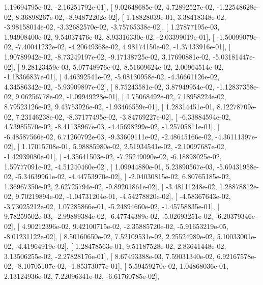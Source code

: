\documentclass{article}
\begin{document}
          1.19694795e-02,  -2.16251792e-01],
       [  9.02648685e-02,   4.72892527e-02,  -1.22548628e-02,
          8.36898267e-02,  -8.94872202e-02],
       [  1.18828039e-01,   3.38418348e-02,  -3.98158014e-02,
         -3.32682570e-02,  -3.75765338e-02],
       [  1.27877195e-03,   1.94908400e-02,   9.54037476e-02,
          8.93316330e-02,  -2.03399019e-01],
       [ -1.50099079e-02,  -7.40041232e-02,  -4.20649368e-02,
          4.98174150e-02,  -1.37133916e-01],
       [  1.90789942e-02,  -8.73249197e-02,  -9.17138725e-02,
          3.17690881e-02,  -5.03181447e-02],
       [  9.28123459e-03,   5.07748976e-02,   8.51609624e-02,
          2.00964514e-02,  -1.18366837e-01],
       [  4.46392541e-02,  -5.08130958e-02,  -4.36661126e-02,
          4.34586342e-02,  -5.93909897e-02],
       [  8.75243581e-02,   3.87949954e-02,  -1.12837358e-02,
          9.06256778e-02,  -1.09949228e-01],
       [  1.75068492e-02,   7.18958224e-02,   8.79523126e-02,
          9.43753926e-02,  -1.93466559e-01],
       [  1.28314451e-01,   8.12278709e-02,   7.23146238e-02,
         -8.37177495e-02,  -3.84769227e-02],
       [ -6.33884594e-02,   4.73985570e-02,  -8.41138967e-03,
         -4.45698299e-02,  -1.25705811e-01],
       [ -6.48587566e-02,   6.71260792e-03,  -9.33609111e-02,
         -2.48645166e-02,  -4.36111397e-02],
       [  1.17015708e-01,   5.98885980e-02,   2.51934541e-02,
         -2.10097687e-02,  -1.42939080e-01],
       [ -4.35641503e-02,  -7.25249090e-02,  -6.18898025e-02,
          1.59777091e-02,  -4.51240460e-02],
       [  1.09944880e-01,   5.23890567e-03,  -5.69431958e-02,
         -5.34639961e-02,  -4.44753970e-02],
       [ -2.04030815e-02,   6.80765185e-02,   1.36967350e-02,
          2.62725794e-02,  -9.89201861e-02],
       [ -3.48111248e-02,   1.28878812e-02,   9.70219894e-02,
         -1.04731204e-01,  -4.54278820e-02],
       [ -4.58367643e-02,  -3.73025212e-02,   1.07285866e-01,
         -5.24894660e-02,  -1.45758835e-01],
       [  9.78259502e-03,  -2.99889384e-02,  -6.47744389e-02,
         -5.02693251e-02,  -6.20379346e-02],
       [  4.90212396e-02,   9.42100715e-02,  -2.35885720e-02,
         -5.91653219e-05,  -8.01231122e-02],
       [  8.50160650e-02,   7.52109531e-02,   2.25524989e-02,
          5.10033001e-02,  -4.41964919e-02],
       [  1.28478563e-01,   9.51187528e-02,   2.83641448e-02,
          3.13506255e-02,  -2.27828176e-01],
       [  8.67493388e-03,   7.59031340e-02,   6.92167578e-02,
         -8.10705107e-02,  -1.85373077e-01],
       [  5.59459270e-02,   1.04868036e-01,   2.13124936e-02,
          7.22096341e-02,  -6.61760785e-02],
\end{document}
